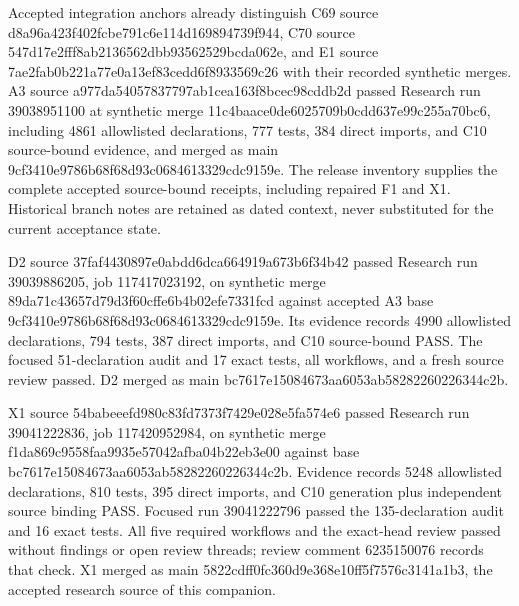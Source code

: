 \documentclass[11pt,a4paper]{article}
\begin{document}
Accepted integration anchors already distinguish C69 source d8a96a423f40\allowbreak{}2fcbe791c6e1\allowbreak{}14d169894739\allowbreak{}f944, C70 source 547d17e2fff8\allowbreak{}ab2136562dbb\allowbreak{}93562529bcda\allowbreak{}062e, and E1 source 7ae2fab0b221\allowbreak{}a77e0a13ef83\allowbreak{}cedd6f893356\allowbreak{}9c26 with their recorded synthetic merges. A3 source a977da540578\allowbreak{}37797ab1cea1\allowbreak{}63f8bcec98cd\allowbreak{}db2d passed Research run 39038951100 at synthetic merge 11c4baace0de\allowbreak{}6025709b0cdd\allowbreak{}637e99c255a7\allowbreak{}0bc6, including 4861 allowlisted declarations, 777 tests, 384 direct imports, and C10 source-bound evidence, and merged as main 9cf3410e9786\allowbreak{}b68f68d93c06\allowbreak{}84613329cdc9\allowbreak{}159e. The release inventory supplies the complete accepted source-bound receipts, including repaired F1 and X1. Historical branch notes are retained as dated context, never substituted for the current acceptance state.

D2 source 37faf4430897\allowbreak{}e0abdd6dca66\allowbreak{}4919a673b6f3\allowbreak{}4b42 passed Research run 39039886205, job 117417023192, on synthetic merge 89da71c43657\allowbreak{}d79d3f60cffe\allowbreak{}6b4b02efe733\allowbreak{}1fcd against accepted A3 base 9cf3410e9786\allowbreak{}b68f68d93c06\allowbreak{}84613329cdc9\allowbreak{}159e. Its evidence records 4990 allowlisted declarations, 794 tests, 387 direct imports, and C10 source-bound PASS. The focused 51-declaration audit and 17 exact tests, all workflows, and a fresh source review passed. D2 merged as main bc7617e15084\allowbreak{}673aa6053ab5\allowbreak{}828226022634\allowbreak{}4c2b.

X1 source 54babeeefd98\allowbreak{}0c83fd7373f7\allowbreak{}429e028e5fa5\allowbreak{}74e6 passed Research run 39041222836, job 117420952984, on synthetic merge f1da869c9558\allowbreak{}faa9935e5704\allowbreak{}2afba04b22eb\allowbreak{}3e00 against base bc7617e15084\allowbreak{}673aa6053ab5\allowbreak{}828226022634\allowbreak{}4c2b. Evidence records 5248 allowlisted declarations, 810 tests, 395 direct imports, and C10 generation plus independent source binding PASS. Focused run 39041222796 passed the 135-declaration audit and 16 exact tests. All five required workflows and the exact-head review passed without findings or open review threads; review comment 6235150076 records that check. X1 merged as main 5822cdff0fc3\allowbreak{}60d9e368e10f\allowbreak{}f5f7576c3141\allowbreak{}a1b3, the accepted research source of this companion.
\end{document}
